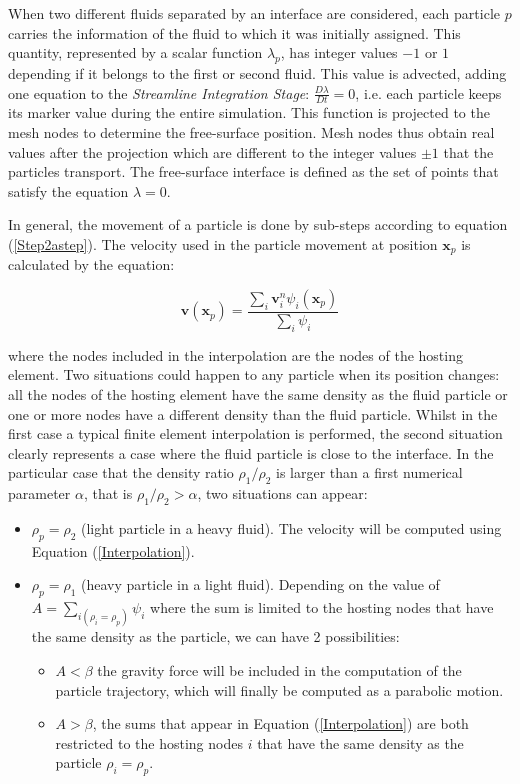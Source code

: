 When two different fluids separated by an interface are considered, each particle $p$ carries the information of the fluid to which it was initially assigned. This quantity, represented by a scalar function $\lambda_p$, has integer values $-1$ or $1$ depending if it belongs to the first or second fluid. This value is advected, adding one equation to the \textit{Streamline Integration Stage}: $\frac{D\lambda}{Dt}=0$, i.e. each particle keeps its marker value during the entire simulation. This function is projected to the mesh nodes to determine the free-surface position. Mesh nodes thus obtain real values after the projection which are different to the integer values $\pm1$ that the particles transport. The free-surface interface is defined as the set of points that satisfy the equation $\lambda=0$.

In general, the movement of a particle is done by sub-steps according to equation (\ref{Step2astep}). The velocity used in the particle movement at position $\mathbf{x}_p$ is calculated by the equation:

\begin{equation}\label{Interpolation}
    \displaystyle \mathbf{v}(\mathbf{x}_p)=\frac{\displaystyle \sum_{i}\mathbf{v}_i^n\psi_i(\mathbf{x}_p)}{\displaystyle \sum_{i}\psi_i}
\end{equation}

where the nodes included in the interpolation are the nodes of the hosting element. Two situations could happen to any particle when its position changes: all the nodes of the hosting element have the same density as the fluid particle or one or more nodes have a different density than the fluid particle. Whilst in the first case a typical finite element interpolation is performed, the second situation clearly represents a case where the fluid particle is close to the interface. In the particular case that the density ratio $\rho_1/\rho_2$ is larger than a first numerical parameter $\alpha$, that is $\rho_1/\rho_2>\alpha$, two situations can appear:

 \begin{itemize}
 \item $\rho_p=\rho_2$ (light particle in a heavy fluid). The velocity will be computed using Equation (\ref{Interpolation}).
   \item $\rho_p=\rho_1$ (heavy particle in a light fluid). Depending on the value of $A=\sum_{i(\rho_i=\rho_p)}\psi_i$ where the sum is limited to the hosting nodes that have the same density as the particle, we can have 2 possibilities:
       \begin{itemize}
 \item $A<\beta$ the gravity force will be included in the computation of the particle trajectory, which will finally be computed as a parabolic motion.
   \item $A>\beta$, the sums that appear in Equation (\ref{Interpolation}) are both restricted to the hosting nodes $i$ that have the same density as the particle $\rho_i=\rho_p$.
 \end{itemize}
 \end{itemize}


